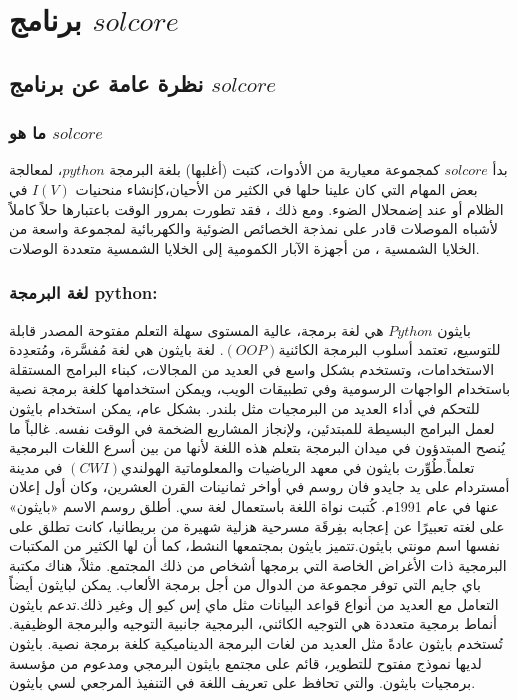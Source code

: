 
\chapter{برنامج $ solcore $}

\label{Chapter2} 





\section*{نظرة عامة عن برنامج $ solcore $}

\subsection{ما هو $ solcore $}
بدأ $ solcore $ كمجموعة معيارية من الأدوات، كتبت (أغلبها) بلغة البرمجة $ python $، لمعالجة بعض المهام التي كان علينا حلها في الكثير من الأحيان،كإنشاء منحنيات $ I(V) $ في الظلام أو عند إضمحلال الضوء. ومع ذلك ، فقد تطورت بمرور الوقت باعتبارها حلاً كاملاً لأشباه الموصلات قادر على نمذجة الخصائص الضوئية والكهربائية لمجموعة واسعة من الخلايا الشمسية ، من أجهزة الآبار الكمومية إلى الخلايا الشمسية متعددة الوصلات.
\subsection{لغة البرمجة python:}

بايثون  $ Python $‏ هي لغة برمجة، عالية المستوى سهلة التعلم مفتوحة المصدر قابلة للتوسيع، تعتمد أسلوب البرمجة الكائنية$  (OOP) $. لغة بايثون هي لغة مُفسَّرة، ومُتعدِدة الاستخدامات، وتستخدم بشكل واسع في العديد من المجالات، كبناء البرامج المستقلة باستخدام الواجهات الرسومية وفي تطبيقات الويب، ويمكن استخدامها كلغة برمجة نصية للتحكم في أداء العديد من البرمجيات مثل بلندر. بشكل عام، يمكن استخدام بايثون لعمل البرامج البسيطة للمبتدئين، ولإنجاز المشاريع الضخمة في الوقت نفسه. غالباً ما يُنصح المبتدؤون في ميدان البرمجة بتعلم هذه اللغة لأنها من بين أسرع اللغات البرمجية تعلماً.طُوِّرت بايثون في معهد الرياضيات والمعلوماتية الهولندي$  (CWI) $ في مدينة أمستردام على يد جايدو فان روسم في أواخر ثمانينات القرن العشرين، وكان أول إعلان عنها في عام 1991م. كُتبت نواة اللغة باستعمال لغة سي. أطلق روسم الاسم «بايثون» على لغته تعبيرًا عن إعجابه بفِرقَة مسرحية هزلية شهيرة من بريطانيا، كانت تطلق على نفسها اسم مونتي بايثون.تتميز بايثون بمجتمعها النشط، كما أن لها الكثير من المكتبات البرمجية ذات الأغراض الخاصة التي برمجها أشخاص من ذلك المجتمع. مثلاً، هناك مكتبة باي جايم التي توفر مجموعة من الدوال من أجل برمجة الألعاب. يمكن لبايثون أيضاً التعامل مع العديد من أنواع قواعد البيانات مثل ماي إس كيو إل وغير ذلك.تدعم بايثون أنماط برمجية متعددة هي التوجيه الكائني، البرمجية جانبية التوجيه والبرمجة الوظيفية. تُستخدم بايثون عادةً مثل العديد من لغات البرمجة الديناميكية كلغة برمجة نصية. بايثون لديها نموذج مفتوح للتطوير، قائم على مجتمع بايثون البرمجي ومدعوم من مؤسسة برمجيات بايثون. والتي تحافظ على تعريف اللغة في التنفيذ المرجعي لسي بايثون. 



